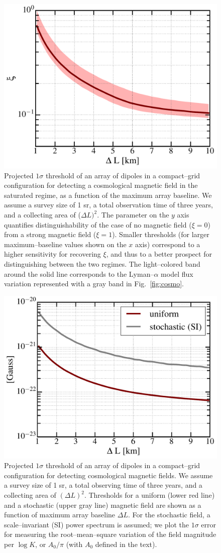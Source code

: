 \begin{figure}
\centering
\includegraphics[width=.4\textwidth,keepaspectratio=true]{xi_vs_deltas.pdf}
\caption{Projected $1\sigma$ threshold of an array of dipoles in a compact--grid configuration for detecting a cosmological magnetic field in the saturated regime, as a function of the maximum array baseline. We assume a survey size of 1 sr, a total observation time of three years, and a collecting area of ($\Delta L)^2$. The parameter on the $y$ axis quantifies distinguishability of the case of no magnetic field ($\xi=0$) from a strong magnetic field ($\xi=1$). Smaller thresholds (for larger maximum--baseline values shown on the $x$ axis) correspond to a higher sensitivity for recovering $\xi$, and thus to a better prospect for distinguishing between the two regimes. The light--colored band around the solid line corresponds to the Lyman--$\alpha$ model flux variation represented with a gray band in Fig.~\ref{fig:cosmo}.\label{fig:xi_vs_deltas}}
\end{figure}
\begin{figure}
\centering
\includegraphics[width=.4\textwidth,keepaspectratio=true]{B_vs_deltas.pdf}
\caption{Projected $1\sigma$ threshold of an array of dipoles in a compact--grid configuration for detecting cosmological magnetic fields. We assume a survey size of 1 sr, a total observing time of three years, and a collecting area of $(\Delta L)^2$. Thresholds for a uniform (lower red line) and a stochastic (upper gray line) magnetic field are shown as a function of maximum array baseline $\Delta L$.  For the stochastic field, a scale--invariant (SI) power spectrum is assumed; we plot the $1\sigma$ error for measuring the root--mean--square variation of the field magnitude per $\log K$, or $A_0/\pi$ (with $A_0$ defined in the text).\label{fig:B_vs_deltas}}
\end{figure}
